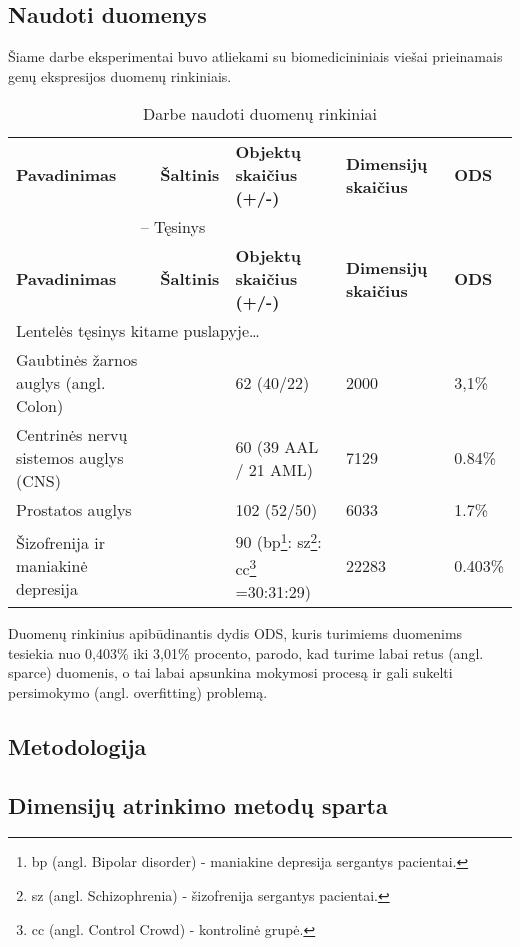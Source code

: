 \subsection{Naudoti duomenys}

Šiame darbe eksperimentai buvo atliekami su biomedicininiais viešai prieinamais
genų ekspresijos duomenų rinkiniais.
\begin{longtable}{|p{4cm}|p{1.4cm}|p{2.5cm}|p{1.6cm}|p{1cm}|}
\captionsetup{labelsep=period}
\caption{Darbe naudoti duomenų rinkiniai\label{table:datasets}}\\
\hline \hline
{\textbf{Pavadinimas}} &
{\textbf{Šaltinis}} &
{\textbf{Objektų skaičius (+/-)}}&
{\textbf{Dimensijų skaičius}}&
{\textbf{ODS}}\\
\hline
\endfirsthead
\multicolumn{3}{c}{{\tablename} \thetable{} -- Tęsinys} \\[0.5ex]
\hline \hline
{\textbf{Pavadinimas}} &
{\textbf{Šaltinis}} &
{\textbf{Objektų skaičius (+/-)}}&
{\textbf{Dimensijų skaičius}}&
{\textbf{ODS}}\\
\hline
\endhead
\multicolumn{3}{l}{{Lentelės tęsinys kitame puslapyje\ldots}} \\
\endfoot
\hline \hline
\endlastfoot
\hline 
Gaubtinės žarnos auglys (angl. Colon) 
& 
\cite{alon1999broad} 
& 
62 (40/22) 
& 
2000 
& 
3,1\% \\
\hline
Centrinės nervų sistemos auglys (CNS) 
& 
\cite{pomeroy2002prediction} 
& 
60 (39 AAL / 21 AML) 
& 
7129 
& 
0.84\% \\
\hline
Prostatos auglys 
& 
\cite{singh2002gene} 
& 
102 (52/50) 
& 
6033 
& 
1.7\% \\
\hline
Šizofrenija ir maniakinė depresija
&
\cite{altara}
&
90 (bp\footnote{bp (angl. Bipolar disorder) - maniakine depresija sergantys
pacientai.}:
sz\footnote{sz (angl. Schizophrenia) - šizofrenija sergantys pacientai.}:
cc\footnote{cc (angl. Control Crowd) - kontrolinė grupė.} =30:31:29)
&
22283
&
0.403\% \\
\hline
\end{longtable}
Duomenų rinkinius apibūdinantis dydis ODS, kuris turimiems duomenims tesiekia
nuo  0,403\% iki 3,01\% procento, parodo, kad turime labai retus (angl. sparce) duomenis, o tai labai apsunkina
mokymosi procesą ir gali sukelti persimokymo (angl. overfitting) problemą.

\subsection{Metodologija}

\subsection{Dimensijų atrinkimo metodų sparta}